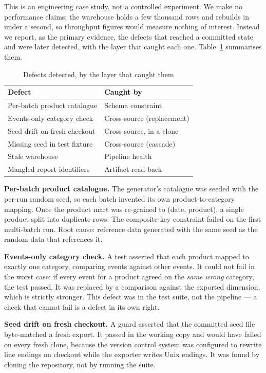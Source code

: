 \documentclass[conference]{IEEEtran}
\begin{document}
This is an engineering case study, not a controlled experiment. We make no
performance claims; the warehouse holds a few thousand rows and rebuilds in
under a second, so throughput figures would measure nothing of interest.
Instead we report, as the primary evidence, the defects that reached a
committed state and were later detected, with the layer that caught each one.
Table~\ref{tab:defects} summarises them.

\begin{table}[t]
\caption{Defects detected, by the layer that caught them}
\label{tab:defects}
\centering
\begin{tabular}{|l|l|}
\hline
\textbf{Defect} & \textbf{Caught by} \\
\hline
Per-batch product catalogue & Schema constraint \\
Events-only category check & Cross-source (replacement) \\
Seed drift on fresh checkout & Cross-source, in a clone \\
Missing seed in test fixture & Cross-source (cascade) \\
Stale warehouse & Pipeline health \\
Mangled report identifiers & Artifact read-back \\
\hline
\end{tabular}
\end{table}

\textbf{Per-batch product catalogue.} The generator's catalogue was seeded with
the per-run random seed, so each batch invented its own product-to-category
mapping. Once the product mart was re-grained to (date, product), a single
product split into duplicate rows. The composite-key constraint failed on the
first multi-batch run. Root cause: reference data generated with the same seed
as the random data that references it.

\textbf{Events-only category check.} A test asserted that each product mapped
to exactly one category, comparing events against other events. It could not
fail in the worst case: if every event for a product agreed on the \emph{same
wrong} category, the test passed. It was replaced by a comparison against the
exported dimension, which is strictly stronger. This defect was in the test
suite, not the pipeline --- a check that cannot fail is a defect in its own
right.

\textbf{Seed drift on fresh checkout.} A guard asserted that the committed seed
file byte-matched a fresh export. It passed in the working copy and would have
failed on every fresh clone, because the version control system was configured
to rewrite line endings on checkout while the exporter writes Unix endings. It
was found by cloning the repository, not by running the suite.
\end{document}
